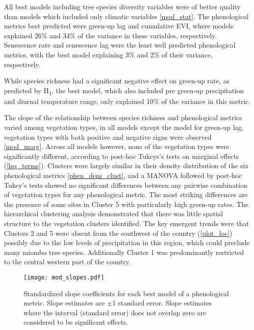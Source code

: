 \documentclass[11pt,a4paper]{article}
\begin{document}
All best models including tree species diversity variables were of better quality than models which included only climatic variables \autoref{mod_stat}. The phenological metrics best predicted were green-up lag and cumulative EVI, where models explained 26\% and 34\% of the variance in these variables, respectively. Senescence rate and senescence lag were the least well predicted phenological metrics, with the best model explaining 3\% and 2\% of their variance, respectively.

While species richness had a significant negative effect on green-up rate, as predicted by H\textsubscript{1}, the best model, which also included pre green-up precipitation and diurnal temperature range, only explained 10\% of the variance in this metric. 

The slope of the relationship between species richness and phenological metrics varied among vegetation types, in all models except the model for green-up lag, vegetation types with both positive and negative signs were observed \autoref{mod_marg}. Across all models however, none of the vegetation types were significantly different, according to post-hoc Tukeys's tests on marginal effects (\autoref{lsq_terms}). Clusters were largely similar in their density distribution of the six phenological metrics \autoref{phen_dens_clust}, and a MANOVA followed by post-hoc Tukey's tests showed no significant differences between any pairwise combination of vegetation types for any phenological metric. The most striking differences are the presence of some sites in Cluster 5 with particularly high green-up rates. The hierarchical clustering analysis demonstrated that there was little spatial structure to the vegetation clusters identified. The key emergent trends were that Clusters 2 and 5 were absent from the southwest of the country (\autoref{plot_loc}) possibly due to the low levels of precipitation in this region, which could preclude many miombo tree species. Additionally Cluster 1 was predominantly restricted to the central western part of the country.



 

\begin{figure}[H]
\centering
	\texttt{[image: mod\_slopes.pdf]}
	\caption{Standardized slope coefficients for each best model of a phenological metric. Slope estimates are $\pm$1 standard error. Slope estimates where the interval (standard error) does not overlap zero are considered to be significant effects.}
	\label{mod_slopes}
\end{figure}
\end{document}
